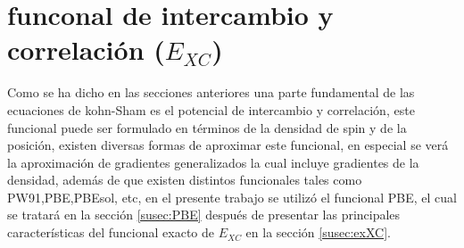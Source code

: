 \documentclass[12pt,a4paper, oneside]{book}
\begin{document}
   \section{funconal de intercambio y correlaci\'on ($E_{XC} $)}\label{sec2:xc}
   Como se ha dicho en las secciones anteriores una parte fundamental de las ecuaciones de kohn-Sham es el potencial de intercambio y correlaci\'on, este funcional puede ser formulado en t\'erminos de la densidad de spin y de la posici\'on, existen diversas formas de aproximar este funcional, en especial se ver\'a la aproximaci\'on de gradientes generalizados la cual incluye gradientes de la densidad, adem\'as de que existen distintos funcionales tales como PW91,PBE,PBEsol, etc, en el presente trabajo se utiliz\'o el funcional PBE, el cual se tratar\'a en la secci\'on \ref{susec:PBE} despu\'es de presentar las principales caracter\'isticas del funcional exacto de $E_{XC}$ en la secci\'on \ref{susec:exXC}. 
\end{document}
